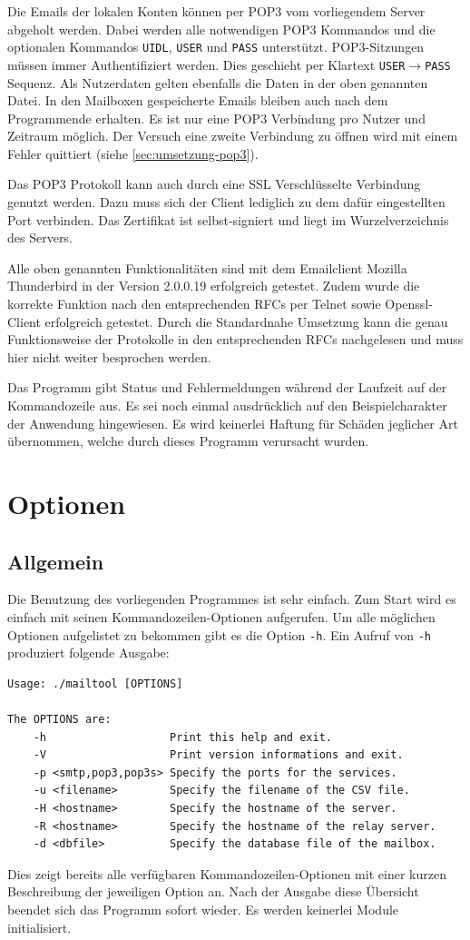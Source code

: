 \documentclass[final,a4paper,11pt,notitlepage,halfparskip]{scrreprt}
\begin{document}
Die Emails der lokalen Konten können per POP3 vom vorliegendem Server abgeholt
werden. Dabei werden alle notwendigen POP3 Kommandos und die optionalen
Kommandos \texttt{UIDL}, \texttt{USER} und \texttt{PASS} unterstützt.
POP3-Sitzungen müssen immer Authentifiziert werden. Dies geschieht per Klartext
\texttt{USER}$\rightarrow$\texttt{PASS} Sequenz. Als Nutzerdaten gelten ebenfalls
die Daten in der oben genannten Datei. In den Mailboxen gespeicherte Emails
bleiben auch nach dem Programmende erhalten. Es ist nur eine POP3 Verbindung pro
Nutzer und Zeitraum möglich. Der Versuch eine zweite Verbindung zu öffnen wird
mit einem Fehler quittiert (siehe \ref{sec:umsetzung-pop3}).

Das POP3 Protokoll kann auch durch eine SSL Verschlüsselte Verbindung genutzt
werden. Dazu muss sich der Client lediglich zu dem dafür eingestellten Port
verbinden. Das Zertifikat ist selbst-signiert und liegt im Wurzelverzeichnis des
Servers.

Alle oben genannten Funktionalitäten sind mit dem Emailclient Mozilla
Thunderbird in der Version 2.0.0.19 erfolgreich getestet. Zudem wurde die
korrekte Funktion nach den entsprechenden RFCs per Telnet sowie Openssl-Client
erfolgreich getestet. Durch die Standardnahe Umsetzung kann die genau
Funktionsweise der Protokolle in den entsprechenden RFCs nachgelesen und muss
hier nicht weiter besprochen werden.

Das Programm gibt Status und Fehlermeldungen während der Laufzeit auf der
Kommandozeile aus. Es sei noch einmal ausdrücklich auf den Beispielcharakter der
Anwendung hingewiesen. Es wird keinerlei Haftung für Schäden jeglicher Art
übernommen, welche durch dieses Programm verursacht wurden.


\section{Optionen}
\subsection{Allgemein}
Die Benutzung des vorliegenden Programmes ist sehr einfach. Zum Start wird es
einfach mit seinen Kommandozeilen-Optionen aufgerufen. Um alle möglichen
Optionen aufgelistet zu bekommen gibt es die Option \texttt{-h}. Ein Aufruf von
\texttt{-h} produziert folgende Ausgabe:
\begin{verbatim}
Usage: ./mailtool [OPTIONS]

The OPTIONS are:
	-h                   Print this help and exit.
	-V                   Print version informations and exit.
	-p <smtp,pop3,pop3s> Specify the ports for the services.
	-u <filename>        Specify the filename of the CSV file.
	-H <hostname>        Specify the hostname of the server.
	-R <hostname>        Specify the hostname of the relay server.
	-d <dbfile>          Specify the database file of the mailbox.
\end{verbatim}
Dies zeigt bereits alle verfügbaren Kommandozeilen-Optionen mit einer kurzen
Beschreibung der jeweiligen Option an. Nach der Ausgabe diese Übersicht beendet
sich das Programm sofort wieder. Es werden keinerlei Module initialisiert. 
\end{document}
